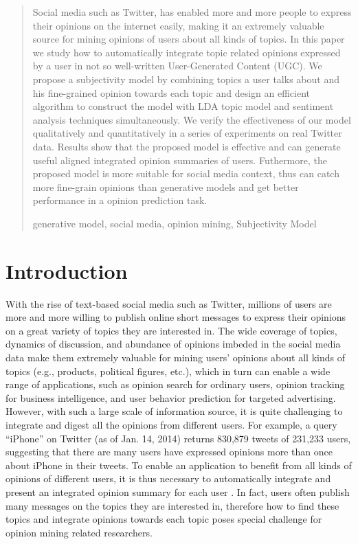 \documentclass[runningheads,a4paper]{llncs}
\newcommand{\keywords}[1]{\par\addvspace\baselineskip
\noindent\keywordname\enspace\ignorespaces#1}
\begin{document}
\begin{abstract}
Social media such as Twitter, has enabled more and more people to express their opinions on the internet easily, making it an extremely valuable source for mining opinions of users about all kinds of topics. In this paper we study how to automatically integrate topic related opinions expressed by a user in not so well-written User-Generated Content (UGC). We propose a subjectivity model by combining topics a user talks about and his fine-grained opinion towards each topic and design an efficient algorithm to construct the model with LDA topic model and sentiment analysis techniques simultaneously. We verify the effectiveness of our model qualitatively and quantitatively in a series of experiments on real Twitter data. Results show that the proposed model is effective and can generate useful aligned integrated opinion summaries of users. Futhermore, the proposed model is more suitable for social media context, thus can catch more fine-grain opinions than generative models and get better performance in a opinion prediction task. 
\keywords{generative model, social media, opinion mining, Subjectivity Model}
\end{abstract}

\section{Introduction}
\label{sec1}

With the rise of text-based social media such as Twitter, millions of users are more and more willing to publish online short messages to express their opinions on a great variety of topics they are interested in. The wide coverage of topics, dynamics of discussion, and abundance of opinions imbeded in the social media data make them extremely valuable for mining users' opinions about all kinds of topics (e.g., products, political figures, etc.), which in turn can enable a wide range of applications, such as opinion search for ordinary users, opinion tracking for business intelligence, and user behavior prediction for targeted advertising. 
However, with such a large scale of information source, it is quite challenging to integrate and digest all the opinions from different users. For example, a query ``iPhone'' on Twitter (as of Jan. 14, 2014) returns 830,879 tweets of 231,233 users, suggesting that there are many users have expressed opinions more than once about iPhone in their tweets. To enable an application to benefit from all kinds of opinions of different users, it is thus necessary to automatically integrate and present an integrated opinion summary for each user \cite{lu2008opinion}. In fact, users often publish many messages on the topics they are interested in, therefore how to find these topics and integrate opinions towards each topic poses special challenge for opinion mining related researchers.
\end{document}
